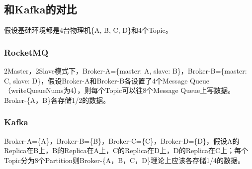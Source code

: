 \subsection{和Kafka的对比}
假设基础环境都是4台物理机\{A, B, C, D\}和4个Topic。

\subsubsection{RocketMQ}
2Master，2Slave模式下，Broker-A=\{master: A, slave: B\}，Broker-B=\{master: C, slave: D\}，假设Broker-A和Broker-B各设置了4个Message Queue（writeQueueNums为4），则每个Topic可以往8个Message Queue上写数据。Broker-\{A，B\}各存储1/2的数据。

\subsubsection{Kafka}
Broker-A=\{A\}，Broker-B=\{B\}，Broker-C=\{C\}，Broker-D=\{D\}，假设A的Replica在B上，B的Replica在A上，C的Replica在D上，D的Replica在C上；每个Topic分为8个Partition则Broker-\{A，B，C，D\}理论上应该各存储1/4的数据。
